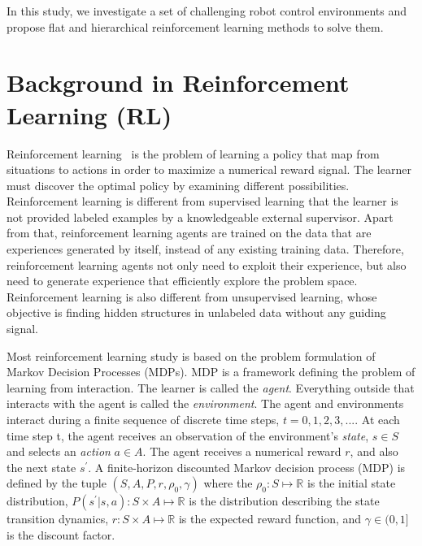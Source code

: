In this study, we investigate a set of challenging robot control environments and propose flat and hierarchical reinforcement learning methods to solve them.
\section{Background in Reinforcement Learning (RL)}
Reinforcement learning~\cite{sutton1998reinforcement} is the problem of learning a policy that map from situations to actions in order to maximize a numerical reward signal. The learner must discover the optimal policy by examining different possibilities. Reinforcement learning is different from supervised learning that the learner is not provided labeled examples by a knowledgeable external supervisor. Apart from that, reinforcement learning agents are trained on the data that are experiences generated by itself, instead of any existing training data. Therefore, reinforcement learning agents not only need to exploit their experience, but also need to generate experience that efficiently explore the problem space.  Reinforcement learning is also different from unsupervised learning, whose objective is finding hidden structures in unlabeled data without any guiding signal.

Most reinforcement learning study is based on the problem formulation of Markov Decision Processes (MDPs). MDP is a framework defining the problem of learning from interaction. The learner is called the \textit{agent}. Everything outside that interacts with the agent is called the \textit{environment}.
The agent and environments interact during a finite sequence of discrete time steps, $t=0,1,2,3,...$. At each time step t, the agent receives an observation of the environment's \textit{state}, $s \in S$ and selects an \textit{action} $a \in A$. The agent receives a numerical reward $r$, and also the next state $s^\prime$.  A finite-horizon discounted Markov decision process (MDP) is defined by the tuple $(S,A,P,r,\rho_0,\gamma) $ where the $\rho_0 : S \mapsto \mathbb{R}$ is the initial state distribution, $P(s^\prime|s,a) : S \times A \mapsto \mathbb{R}$ is the distribution describing the state transition dynamics, $r : S \times A \mapsto \mathbb{R}$ is the expected reward function, and $\gamma \in (0,1]$ is the discount factor.

